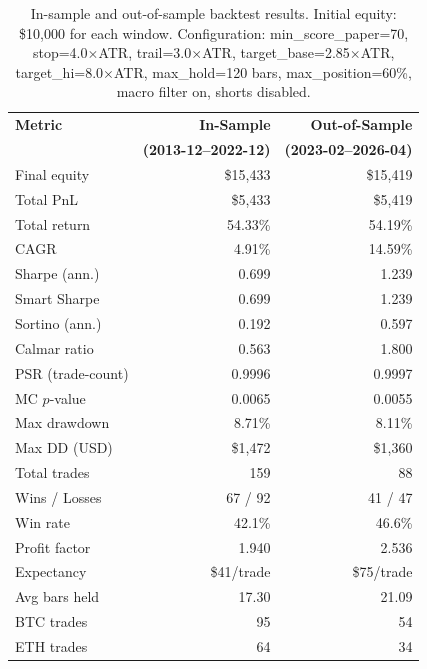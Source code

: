 \documentclass{article}
\begin{document}
\begin{table}[h]
\centering
\caption{In-sample and out-of-sample backtest results. Initial equity: \$10,000 for each window. Configuration: min\_score\_paper=70, stop=4.0$\times$ATR, trail=3.0$\times$ATR, target\_base=2.85$\times$ATR, target\_hi=8.0$\times$ATR, max\_hold=120 bars, max\_position=60\%, macro filter on, shorts disabled.}
\label{tab:full_history}
\small
\begin{tabular}{@{}lrr@{}}
\toprule
\textbf{Metric} & \textbf{In-Sample} & \textbf{Out-of-Sample} \\
                & \textbf{(2013-12--2022-12)} & \textbf{(2023-02--2026-04)} \\
\midrule
Final equity        & \$15,433       & \$15,419 \\
Total PnL           & \$5,433        & \$5,419 \\
Total return        & 54.33\%        & 54.19\% \\
CAGR                & 4.91\%         & 14.59\% \\
Sharpe (ann.)       & 0.699          & 1.239 \\
Smart Sharpe        & 0.699          & 1.239 \\
Sortino (ann.)      & 0.192          & 0.597 \\
Calmar ratio        & 0.563          & 1.800 \\
PSR (trade-count)   & 0.9996         & 0.9997 \\
MC $p$-value        & 0.0065         & 0.0055 \\
Max drawdown        & 8.71\%         & 8.11\% \\
Max DD (USD)        & \$1,472        & \$1,360 \\
Total trades        & 159            & 88 \\
Wins / Losses       & 67 / 92        & 41 / 47 \\
Win rate            & 42.1\%         & 46.6\% \\
Profit factor       & 1.940          & 2.536 \\
Expectancy          & \$41/trade     & \$75/trade \\
Avg bars held       & 17.30          & 21.09 \\
BTC trades          & 95             & 54 \\
ETH trades          & 64             & 34 \\
\bottomrule
\end{tabular}
\end{table}
\end{document}
